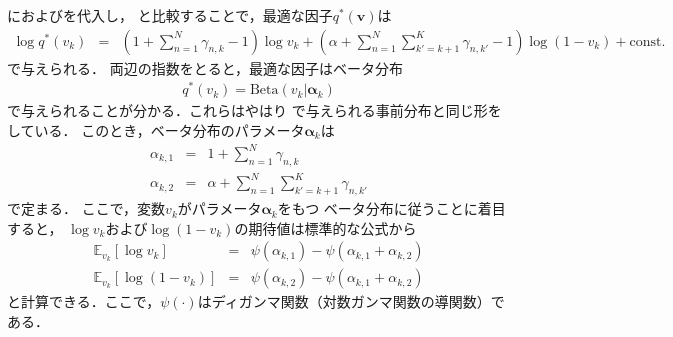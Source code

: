 におよびを代入し，
と比較することで，最適な因子$q^*(\bm{v})$は
\begin{eqnarray}
 \log q^*(v_k) 
  &=& 
  \left(1 + \sum_{n=1}^{N} \gamma_{n,k} - 1 \right) \log v_k
   + \left(\alpha + \sum_{n=1}^{N}\sum_{k'=k+1}^{K} \gamma_{n,k'} - 1 \right) \log (1 - v_k)   
   + \mbox{const.}
   \label{eq:qv}
\end{eqnarray}
で与えられる．
両辺の指数をとると，最適な因子はベータ分布
\begin{eqnarray}
 q^*(v_k) = \mbox{Beta}(v_k|\bm\alpha_k)
\end{eqnarray}
で与えられることが分かる．これらはやはり
で与えられる事前分布と同じ形をしている．
このとき，ベータ分布のパラメータ$\bm\alpha_k$は
\begin{eqnarray}
 \alpha_{k,1} 
 &=& 1 + \sum_{n=1}^{N} \gamma_{n,k}
 \label{eq:alpha1}\\
 \alpha_{k,2}
 &=& \alpha + \sum_{n=1}^{N}\sum_{k'=k+1}^{K} \gamma_{n,k'}
 \label{eq:alpha2}
\end{eqnarray}
で定まる．
ここで，変数$v_k$がパラメータ$\bm\alpha_k$をもつ
ベータ分布に従うことに着目すると，
$\log v_k$および$\log (1 - v_k)$の期待値は標準的な公式から
\begin{eqnarray}
 \mathbb{E}_{v_k}[\log v_k] 
  &=& \psi\left(\alpha_{k,1}\right) - \psi\left(\alpha_{k,1} + \alpha_{k,2}\right)
  \label{eq:epi1}
 \\
 \mathbb{E}_{v_k}[\log (1 - v_k)] 
  &=& \psi\left(\alpha_{k,2}\right) - \psi\left(\alpha_{k,1} + \alpha_{k,2}\right)
  \label{eq:epi2}
\end{eqnarray}
と計算できる．ここで，$\psi(\cdot)$はディガンマ関数（対数ガンマ関数の導関数）である．


